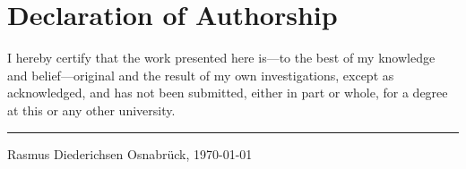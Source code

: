 \chapter*{Declaration of Authorship}

I hereby certify that the work presented here is---to the best of my knowledge
and belief---original and the result of my own investigations, except as
acknowledged, and has not been submitted, either in part or whole, for a degree
at this or any other university.

\vspace{2cm}

\noindent\rule{5cm}{1pt}

\noindent Rasmus Diederichsen \hfill{} Osnabrück, \today
